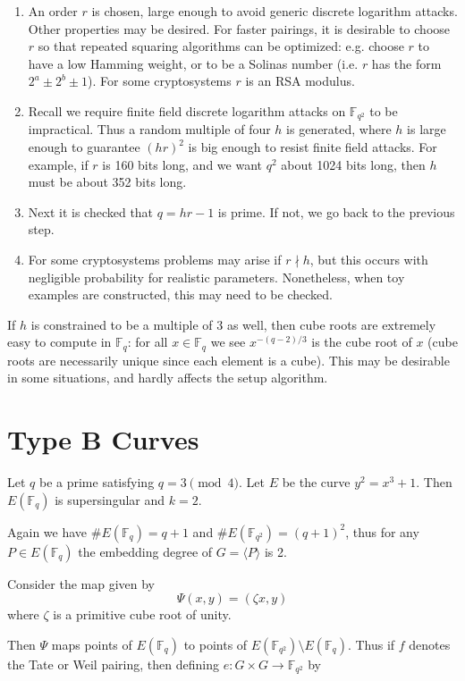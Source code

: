 \begin{enumerate}
\item
An order $r$ is chosen, large enough to avoid generic discrete logarithm
attacks. Other properties may be desired.
For faster pairings, it is desirable to choose $r$ so that repeated squaring
algorithms can be optimized: e.g. choose $r$ to have a low Hamming weight,
or to be a Solinas number (i.e. $r$ has the form $2^a \pm 2^b \pm 1$).
For some cryptosystems $r$ is
an RSA modulus.
\item
Recall we require finite field discrete logarithm attacks on $\mathbb{F}_{q^2}$
to be impractical. Thus a random multiple of four $h$ is generated,
where $h$ is large enough to guarantee $(hr)^2$ is big enough to resist
finite field attacks. For example, if $r$ is 160 bits long, and we want
$q^2$ about 1024 bits long, then $h$ must be about 352 bits long.
\item
Next it is checked that $q = h r - 1$ is prime.
If not, we go back to the previous step.
\item
For some cryptosystems problems may arise if $r \nmid h$, but this occurs
with negligible probability for realistic parameters. Nonetheless, when toy
examples are constructed, this may need to be checked.
\end{enumerate}

If $h$ is constrained to be a multiple of $3$ as well, then cube roots are
extremely easy to compute in $\mathbb{F}_{q}$:
for all $x \in \mathbb{F}_q$ we see $x^{-(q-2)/3}$ is the cube root of $x$
(cube roots are necessarily unique since each element is a cube).
This may be desirable in some situations, and hardly affects the setup
algorithm.

\section { Type B Curves }

Let $q$ be a prime satisfying $q = 3 \pmod{4}$.
Let $E$ be the curve $y^2 = x^3 + 1$. Then
$E(\mathbb{F}_q)$ is supersingular and $k = 2$.

Again we have $\#E(\mathbb{F}_q) = q+1$ and $\#E(\mathbb{F}_{q^2}) = (q+1)^2$,
thus for any $P\in E(\mathbb{F}_q)$
the embedding degree of $G = \langle P \rangle$ is 2.

Consider the map given by
\[ \Psi(x, y) = (\zeta x, y) \]
where $\zeta$ is a primitive cube root of unity.

Then $\Psi$ maps points of $E(\mathbb{F}_q)$ to points of
$E(\mathbb{F}_{q^2}) \setminus E(\mathbb{F}_q)$. Thus if $f$ denotes the
Tate or Weil pairing, then defining $e:G \times G \rightarrow \mathbb{F}_{q^2}$
by

